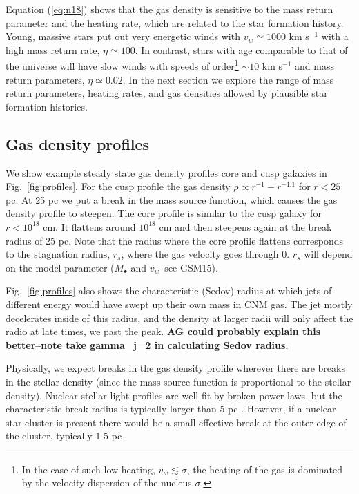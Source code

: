 \documentclass[usenatbib,fleqn]{mnras}
\newcommand{\Mbh}[1][]{M_{\bullet#1}}
\begin{document}
Equation (\ref{eq:n18}) shows that the gas density is sensitive to the
mass return parameter and the heating rate, which are related to the
star formation history. Young, massive stars put out very energetic
winds with $v_w\simeq 1000$ km s$^{-1}$ with a high mass return rate,
$\eta\simeq 100$.  In contrast, stars with age comparable to that of
the universe will have slow winds with speeds of order\footnote{In the
  case of such low heating, $v_w \lesssim \sigma$, the heating of the
  gas is dominated by the velocity dispersion of the nucleus
  $\sigma$.} $\sim 10$ km s$^{-1}$ and mass return parameters,
$\eta\simeq0.02$. In the next section we explore the range of mass
return parameters, heating rates, and gas densities allowed by
plausible star formation histories.

\subsection{Gas density profiles}
We show example steady state gas density profiles core and cusp
galaxies in Fig.~\ref{fig:profiles}. For the cusp profile the gas density
$\rho \propto r^{-1}-r^{-1.1}$ for $r < 25$ pc. At 25 pc we put a
break in the mass source function, which causes the gas density
profile to steepen. The core profile is similar to the cusp
galaxy for $r<10^{18}$ cm. It flattens around $10^{18}$ cm and then
steepens again at the break radius of 25 pc. Note that the radius
where the core profile flattens corresponds to the stagnation
radius,  $r_s$,  where the gas velocity goes through 0.  $r_s$ will
depend on the model parameter ($\Mbh$ and $v_w$--see GSM15).

Fig.~\ref{fig:profiles} also shows the characteristic (Sedov) radius at which
jets of different energy would have swept up their own mass in CNM
gas.  The jet mostly decelerates inside of this radius, and the
density at larger radii will only affect the radio at late times, we
past the peak. {\bf AG could probably explain this better--note take
  gamma_j=2 in calculating Sedov radius.}

Physically, we expect breaks in the gas density profile wherever there
are breaks in the stellar density (since the mass source function is
proportional to the stellar density).  Nuclear stellar light profiles
are well fit by broken power laws, but the characteristic break radius
is typically larger than $5 $ pc \citep{Lauer+2007}. However, if a
nuclear star cluster is present there would be a small effective break
at the outer edge of the cluster, typically 1-5 pc
\citep{Georgiev+2014}.
\end{document}
